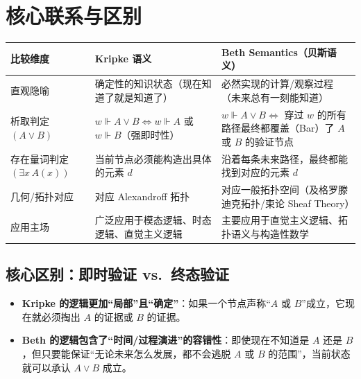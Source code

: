 \documentclass[UTF8,a4paper,11pt]{ctexart}
\begin{document}
\section{核心联系与区别}

\begin{table}[htbp]
  \centering
  \small
  \begin{tabular}{>{\raggedright\arraybackslash}p{2.8cm}
                  >{\raggedright\arraybackslash}p{5.8cm}
                  >{\raggedright\arraybackslash}p{5.8cm}}
    \toprule
    \textbf{比较维度} & \textbf{Kripke 语义} & \textbf{Beth Semantics（贝斯语义）} \\
    \midrule
    直观隐喻
      & 确定性的知识状态（现在知道了就是知道了）
      & 必然实现的计算/观察过程（未来总有一刻能知道） \\
    \addlinespace
    析取判定\newline$(A \lor B)$
      & $w \Vdash A \lor B \iff w \Vdash A$ 或 $w \Vdash B$（强即时性）
      & $w \Vdash A \lor B \iff$ 穿过 $w$ 的所有路径最终都覆盖（Bar）了 $A$ 或 $B$ 的验证节点 \\
    \addlinespace
    存在量词判定\newline$(\exists x\, A(x))$
      & 当前节点必须能构造出具体的元素 $d$
      & 沿着每条未来路径，最终都能找到对应的元素 $d$ \\
    \addlinespace
    几何/拓扑对应
      & 对应 Alexandroff 拓扑
      & 对应一般拓扑空间（及格罗滕迪克拓扑/束论 Sheaf Theory） \\
    \addlinespace
    应用主场
      & 广泛应用于模态逻辑、时态逻辑、直觉主义逻辑
      & 主要应用于直觉主义逻辑、拓扑语义与构造性数学 \\
    \bottomrule
  \end{tabular}
\end{table}

\subsection{核心区别：即时验证 vs.\ 终态验证}

\begin{itemize}[leftmargin=2em]
  \item \textbf{Kripke 的逻辑更加“局部”且“确定”}：如果一个节点声称“$A$ 或 $B$”成立，它现在就必须掏出 $A$ 的证据或 $B$ 的证据。
  \item \textbf{Beth 的逻辑包含了“时间/过程演进”的容错性}：即使现在不知道是 $A$ 还是 $B$，但只要能保证“无论未来怎么发展，都不会逃脱 $A$ 或 $B$ 的范围”，当前状态就可以承认 $A \lor B$ 成立。
\end{itemize}
\end{document}
